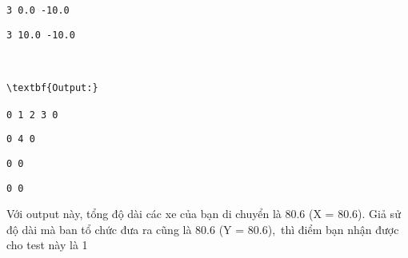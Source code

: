 \begin{verbatim}
3 0.0 -10.0\end{verbatim}
\begin{verbatim}
3 10.0 -10.0



\textbf{Output:}

0 1 2 3 0\end{verbatim}
\begin{verbatim}
0 4 0\end{verbatim}
\begin{verbatim}
0 0\end{verbatim}
\begin{verbatim}
0 0\end{verbatim}

Với output này, tổng độ dài các xe của bạn di chuyển là 80.6 (X = 80.6). Giả sử độ dài mà ban tổ chức đưa ra cũng là 80.6 (Y = 80.6), thì điểm bạn nhận được cho test này là 1
